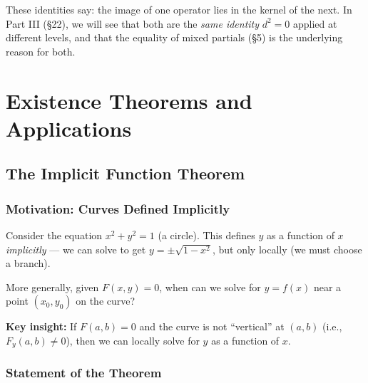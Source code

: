 \documentclass[11pt]{report}
\begin{document}
These identities say: the image of one operator lies in the kernel of the next. In Part III (\S22), we will see that both are the \textit{same identity} $d^2 = 0$ applied at different levels, and that the equality of mixed partials (\S5) is the underlying reason for both.

\chapter{Existence Theorems and Applications}

\section{The Implicit Function Theorem}

\subsection*{Motivation: Curves Defined Implicitly}

Consider the equation $x^2 + y^2 = 1$ (a circle). This defines $y$ as a function of $x$ \textit{implicitly} --- we can solve to get $y = \pm\sqrt{1 - x^2}$, but only locally (we must choose a branch).

\begin{center}
\end{center}

More generally, given $F(x, y) = 0$, when can we solve for $y = f(x)$ near a point $(x_0, y_0)$ on the curve?

\textbf{Key insight:} If $F(a, b) = 0$ and the curve is not ``vertical'' at $(a, b)$ (i.e., $F_y(a, b) \neq 0$), then we can locally solve for $y$ as a function of $x$.

\subsection{Statement of the Theorem}
\end{document}
